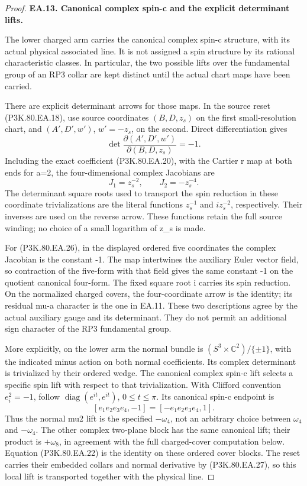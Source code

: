 \begin{proof}
\par\medskip\noindent\textbf{EA.13. Canonical complex spin-c and the explicit determinant lifts.}\par\nopagebreak[4]

The lower charged arm carries the canonical complex spin-c structure,
with its actual physical associated line. It is not assigned a spin
structure by its rational characteristic classes. In particular, the
two possible lifts over the fundamental group of an RP3 collar are
kept distinct until the actual chart maps have been carried.

There are explicit determinant arrows for those maps. In the source
reset (P3K.80.EA.18), use source coordinates \((B,D,z_s)\) on the first
small-resolution chart, and \((A',D',w')\), \(w'=-z_s\), on
the second. Direct differentiation gives
\[
 \det\frac{\partial(A',D',w')}{\partial(B,D,z_s)}=-1.
\]
Including the exact coefficient (P3K.80.EA.20), with the Cartier r map at
both ends for a=2, the four-dimensional complex Jacobians are
\[
  J_1=z_s^{-2},\qquad J_2=-z_s^{-4}.
 \tag{P3K.80.EA.27}
\]
The determinant square roots used to transport the spin reduction
in these coordinate trivializations are the literal functions
\(z_s^{-1}\) and \(i z_s^{-2}\), respectively. Their inverses
are used on the reverse arrow. These functions retain the full
source winding; no choice of a small logarithm of z\_s is made.

For (P3K.80.EA.26), in the displayed ordered five coordinates the complex
Jacobian is the constant -1. The map intertwines the auxiliary
Euler vector field, so contraction of the five-form with that
field gives the same constant -1 on the quotient canonical
four-form. The fixed square root i carries its spin reduction.
On the normalized charged covers, the four-coordinate arrow is
the identity; its residual mu-a character is the one in EA.11.
These two descriptions agree by the actual auxiliary gauge and
its determinant. They do not permit an additional sign character
of the RP3 fundamental group.

More explicitly, on the lower arm the normal bundle is
\((S^3\times\mathbb C^2)/\{\pm1\}\), with the indicated
minus action on both normal coefficients. Its complex determinant
is trivialized by their ordered wedge. The canonical complex
spin-c lift selects a specific spin lift with respect to that
trivialization. With Clifford convention \(e_i^2=-1\), follow
\(\operatorname{diag}(e^{it},e^{it})\), \(0\le t\le\pi\).
Its canonical spin-c endpoint is
\[
 [e_1e_2e_3e_4,-1]=[-e_1e_2e_3e_4,1].
 \tag{P3K.80.EA.27a}
\]
Thus the normal mu2 lift is the specified \(-\omega_4\), not an
arbitrary choice between \(\omega_4\) and \(-\omega_4\).
The other complex two-plane block has the same canonical lift;
their product is \(+\omega_8\), in agreement with the full
charged-cover computation below. Equation (P3K.80.EA.22) is the identity
on these ordered cover blocks. The reset carries their embedded
collars and normal derivative by (P3K.80.EA.27), so this local lift is
transported together with the physical line.


\end{proof}
